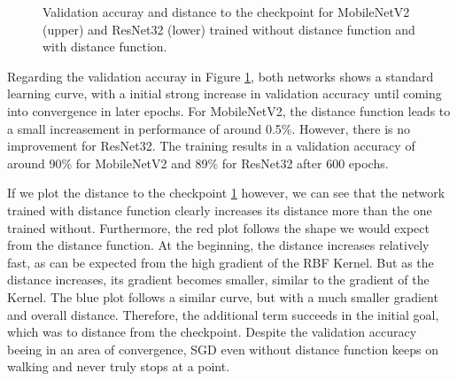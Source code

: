 \begin{figure}[H]
\begin{center}
        \caption{Validation accuray and distance to the checkpoint for MobileNetV2 (upper) and ResNet32 (lower) trained without distance function and with distance function.}
        \label{fig:Results_baseline}
    \end{center}
\end{figure}


Regarding the validation accuray in Figure \ref{fig:Results_baseline}, both
networks shows a standard learning curve, with a initial strong increase in
validation accuracy until coming into convergence in later epochs. For
MobileNetV2, the distance function leads to a small increasement in performance
of around 0.5\%. However, there is no improvement for ResNet32. The training
results in a validation accuracy of around 90\% for MobileNetV2 and 89\% for
ResNet32 after 600 epochs.

If we plot the distance to the checkpoint \ref{fig:Results_baseline} however, we
can see that the network trained with distance function clearly increases its
distance more than the one trained without. Furthermore, the red plot follows
the shape we would expect from the distance function. At the beginning, the
distance increases relatively fast, as can be expected from the high gradient of
the RBF Kernel. But as the distance increases, its gradient becomes smaller,
similar to the gradient of the Kernel. The blue plot follows a similar curve, but
with a much smaller gradient and overall distance. Therefore, the additional
term succeeds in the initial goal, which was to distance from the checkpoint.
Despite the validation accuracy beeing in an area of convergence, SGD
even without distance function keeps on walking and never truly stops at a
point.





